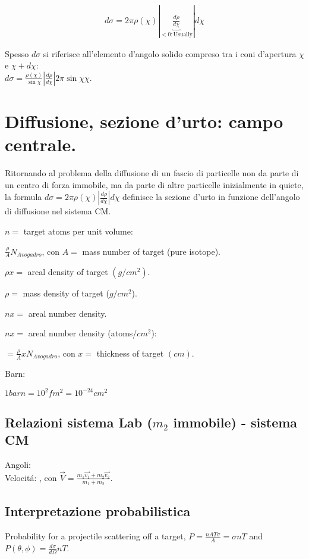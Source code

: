 \documentclass[main.tex]{subfiles}
\begin{document}
\begin{align*}
d\sigma=2\pi\rho(\chi)|\underbrace{\frac{d\rho}{d\chi}}_{<0: \text{Usually}}| d\chi
\end{align*}

Spesso $d\sigma$ si riferisce all'elemento d'angolo solido compreso tra i coni d'apertura $\chi$ e $\chi+d\chi$:\\ $d\sigma=\frac{\rho(\chi)}{\sin{\chi}}|\frac{d\rho}{d\chi}|2\pi\sin{\chi}\chi$.


\section{Diffusione, sezione d'urto: campo centrale.}

Ritornando al problema della diffusione di un fascio di particelle non da parte di un centro di forza immobile, ma da parte di altre particelle inizialmente in quiete, la formula $d\sigma=2\pi\rho(\chi)|\frac{d\rho}{d\chi}| d\chi$ definisce la sezione d'urto in funzione dell'angolo di diffusione nel sistema CM.

$n=$ target atoms per unit volume:

$\frac{\rho}{A}N_{Avogadro}$, con $A=$ mass number of target (pure isotope).

$\rho x=$ areal density of target $(g/{cm}^2)$.

$\rho=$ mass density of target ($g/{cm}^2$).

$nx=$ areal number density.

$nx=$ areal number density (atoms/${cm}^2$):

$=\frac{\rho}{A}xN_{Avogadro}$, con $x=$ thickness of target $(cm)$. 

Barn:

$1 barn=10^2 fm^2=10^{-24}cm^2$

\subsection{Relazioni sistema Lab ($m_2$ immobile) - sistema CM}
Angoli: \\
Velocit\'a: , con $\vec{V}=\frac{m_1\vec{v_1}+m_2\vec{v_2}}{m_1+m_2}$.

\subsection{Interpretazione probabilistica}
Probability for a projectile scattering off a target, $P=\frac{nAT\sigma}{A}=\sigma nT$ and $P(\theta,\phi)=\frac{d\sigma}{d\Omega}nT$.\\
\end{document}

